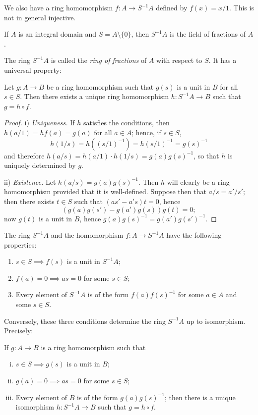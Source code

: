 We also have a ring homomorphism $f \colon A \to S^{-1}A$ defined by $f(x) = x/1$. This is not in general injective.

\begin{remark}
If $A$ is an integral domain and $S = A \setminus \{0\}$, then $S^{-1}A$ is the field of fractions of $A$.
\end{remark}

The ring $S^{-1}A$ is called the \emph{ring of fractions} of $A$ with respect to $S$. It has a universal property:

\begin{proposition}\label{pro:universal property of ring of fractions}
Let $g \colon A \to B$ be a ring homomorphism such that $g(s)$ is a unit in $B$ for all $s \in S$. Then there exists a unique ring homomorphism $h \colon S^{-1}A \to B$ such that $g = h \circ f$.
\end{proposition}

\begin{proof}
i) \textit{Uniqueness.} If $h$ satisfies the conditions, then $h(a/1) = hf(a) = g(a)$ for all $a \in A$; hence, if $s \in S$,
\[
    h(1/s) = h((s/1)^{-1}) = h(s/1)^{-1} = g(s)^{-1}
\]
and therefore $h(a/s) = h(a/1) \cdot h(1/s) = g(a)g(s)^{-1}$, so that $h$ is uniquely determined by $g$.

ii) \textit{Existence.} Let $h(a/s) = g(a)g(s)^{-1}$. Then $h$ will clearly be a ring homomorphism provided that it is well-defined. Suppose then that $a/s = a'/s'$; then there exists $t \in S$ such that $(as' - a's)t = 0$, hence
\[
    (g(a)g(s') - g(a')g(s))g(t) = 0;
\]
now $g(t)$ is a unit in $B$, hence $g(a)g(s)^{-1} = g(a')g(s')^{-1}$.
\end{proof}

The ring $S^{-1}A$ and the homomorphism $f \colon A \to S^{-1}A$ have the following properties:
\begin{enumerate}[1)]
    \item $s \in S \implies f(s)$ is a unit in $S^{-1}A$;
    \item $f(a) = 0 \implies as = 0$ for some $s \in S$;
    \item Every element of $S^{-1}A$ is of the form $f(a)f(s)^{-1}$ for some $a \in A$ and some $s \in S$.
\end{enumerate}

Conversely, these three conditions determine the ring $S^{-1}A$ up to isomorphism. Precisely:

\begin{corollary}\label{cor:characterization-localization}
If $g \colon A \to B$ is a ring homomorphism such that
\begin{enumerate}[i)]
    \item $s \in S \implies g(s)$ is a unit in $B$;
    \item $g(a) = 0 \implies as = 0$ for some $s \in S$;
    \item Every element of $B$ is of the form $g(a)g(s)^{-1}$; then there is a unique isomorphism $h \colon S^{-1}A \to B$ such that $g = h \circ f$.
\end{enumerate}
\end{corollary}

